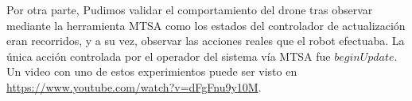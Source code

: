 Por otra parte, Pudimos validar el comportamiento del drone tras observar mediante la herramienta MTSA como los estados
del controlador de actualización eran recorridos, y a su vez, observar las acciones reales que el robot efectuaba. La
única acción controlada por el operador del sistema vía MTSA fue $beginUpdate$. Un video con uno de estos experimientos
puede ser visto en \url{https://www.youtube.com/watch?v=dFgFnu9y10M}.


